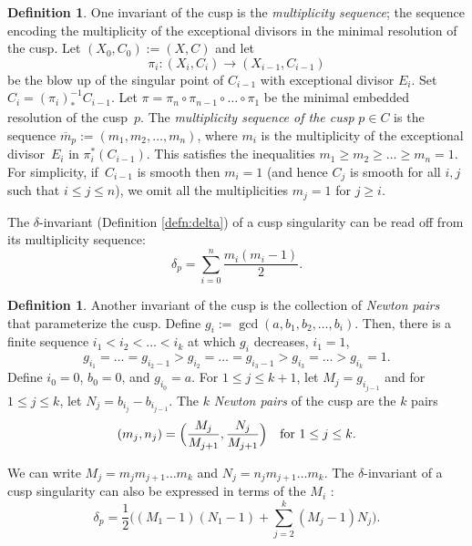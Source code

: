 \documentclass[JEP,XML,SOM,Unicode,NoFloatCountersInSection,published]{cedram}
\theoremstyle{plain}
\theoremstyle{definition}
\newtheorem{definition}[theorem]{Definition}
\begin{document}
\begin{definition}\label{defn:multiplicitysequence}
One invariant of the cusp is the \emph{multiplicity sequence}; the sequence encoding the multiplicity of the exceptional divisors in the minimal resolution of the cusp. Let $(X_0, C_0) := (X,C)$ and let
\[
\pi_i: (X_i,C_i) \to (X_{i-1}, C_{i-1})
\]
be the blow up of the singular point of $C_{i-1}$ with exceptional divisor $E_i$. Set $C_i = (\pi_i)^{-1}_* C_{i-1}$. Let $\pi = \pi_n \circ \pi_{n-1}\circ \dots \circ \pi_1$ be the minimal embedded resolution of the cusp~$p$. The \textit{multiplicity sequence of the cusp} $p \in C$ is the sequence $\overline{m}_p := (m_1, m_2, \dots, m_n)$, where $m_i$ is the multiplicity of the exceptional divisor~$E_i$ in $\pi_i^*(C_{i-1})$. This satisfies the inequalities $m_1 \ge m_2 \ge \dots \ge m_n = 1$. For simplicity, if~$C_{i-1}$ is smooth then $m_i = 1$ (and hence $C_j$ is smooth for all $i,j$ such that $i \le j \le n$), we omit all the multiplicities $m_j =1$ for $j\ge i$.
\end{definition}

The $\delta$-invariant (Definition \ref{defn:delta}) of a cusp singularity can be read off from its multiplicity sequence:
\begin{equation}\label{deltamultiplicity}
\delta_p = \sum_{i = 0}^n \frac{m_i(m_i-1)}{2}.
\end{equation}

\begin{definition}\label{defn:newtonpairs}
Another invariant of the cusp is the collection of \emph{Newton pairs} that parameterize the cusp. Define $g_i := \gcd(a,b_1,b_2, \dots ,b_i)$. Then, there is a finite sequence $i_1 < i_2 < \dots < i_k$ at which $g_i$ decreases, \ie $i_1 = 1$,
\[
g_{i_1} = \dots = g_{i_2 - 1} > g_{i_2} = \dots =g_{i_3-1} > g_{i_3} = \dots > g_{i_k} = 1.
\]
Define $i_0 = 0$, $b_0 = 0$, and $g_{i_0} = a$. For $1 \le j \le k+1$, let $M_j = g_{i_{j-1}}$ and for $1 \le j \le k$, let $N_j = b_{i_j} - b_{i_{j-1}}$. The $k$ \textit{Newton pairs} of the cusp are the $k$ pairs
\[
(m_j, n_j) = \Bigl(\frac{M_j}{M_{j+1}}, \frac{N_j}{M_{j+1}} \Bigr)\quad\text{for } 1 \le j \le k .
\]
\end{definition}

We can write $M_j = m_j m_{j+1} \dots m_k$ and $N_j = n_j m_{j+1} \dots m_k$. The $\delta$-invariant of a cusp singularity can also be expressed in terms of the $M_i$ \cite[2.1.1]{TKThesis}:
\begin{equation}\label{delta}
\delta_p = \frac{1}{2} \biggl((M_1-1)(N_1-1) + \sum_{j=2}^k(M_j-1)N_j \biggr).
\end{equation}
\end{document}
